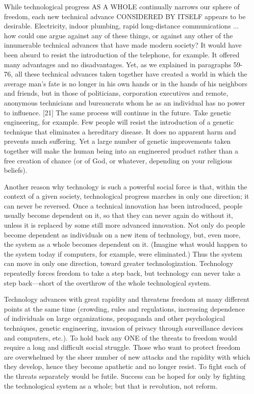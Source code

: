  While technological progress AS A WHOLE continually narrows our sphere of freedom, each new technical advance CONSIDERED BY ITSELF appears to be desirable. Electricity, indoor plumbing, rapid long-distance communications ... how could one argue against any of these things, or against any other of the innumerable technical advances that have made modern society? It would have been absurd to resist the introduction of the telephone, for example. It offered many advantages and no disadvantages. Yet, as we explained in paragraphs 59-76, all these technical advances taken together have created a world in which the average man’s fate is no longer in his own hands or in the hands of his neighbors and friends, but in those of politicians, corporation executives and remote, anonymous technicians and bureaucrats whom he as an individual has no power to influence. [21] The same process will continue in the future. Take genetic engineering, for example. Few people will resist the introduction of a genetic technique that eliminates a hereditary disease. It does no apparent harm and prevents much suffering. Yet a large number of genetic improvements taken together will make the human being into an engineered product rather than a free creation of chance (or of God, or whatever, depending on your religious beliefs).

 Another reason why technology is such a powerful social force is that, within the context of a given society, technological progress marches in only one direction; it can never be reversed. Once a technical innovation has been introduced, people usually become dependent on it, so that they can never again do without it, unless it is replaced by some still more advanced innovation. Not only do people become dependent as individuals on a new item of technology, but, even more, the system as a whole becomes dependent on it. (Imagine what would happen to the system today if computers, for example, were eliminated.) Thus the system can move in only one direction, toward greater technologization. Technology repeatedly forces freedom to take a step back, but technology can never take a step back—short of the overthrow of the whole technological system.

 Technology advances with great rapidity and threatens freedom at many different points at the same time (crowding, rules and regulations, increasing dependence of individuals on large organizations, propaganda and other psychological techniques, genetic engineering, invasion of privacy through surveillance devices and computers, etc.). To hold back any ONE of the threats to freedom would require a long and difficult social struggle. Those who want to protect freedom are overwhelmed by the sheer number of new attacks and the rapidity with which they develop, hence they become apathetic and no longer resist. To fight each of the threats separately would be futile. Success can be hoped for only by fighting the technological system as a whole; but that is revolution, not reform.

